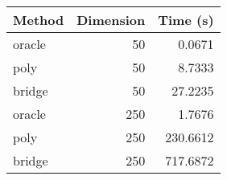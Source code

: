 
\begin{tabular}{lrr}
    \toprule
    Method & Dimension & Time (s) \\
    \midrule
    oracle & 50        & 0.0671   \\
    poly   & 50        & 8.7333   \\
    bridge & 50        & 27.2235  \\
    \addlinespace
    oracle & 250       & 1.7676   \\
    poly   & 250       & 230.6612 \\
    bridge & 250       & 717.6872 \\
    \bottomrule
\end{tabular}